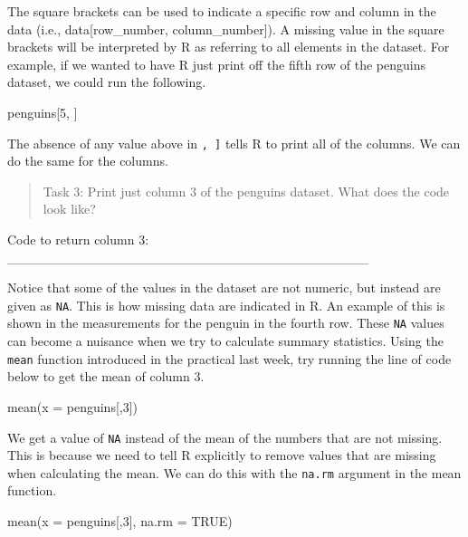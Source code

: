 \documentclass[
]{scrbook}
\newenvironment{Shaded}{\begin{snugshade}}{\end{snugshade}}
\newcommand{\AttributeTok}[1]{\textcolor[rgb]{0.77,0.63,0.00}{#1}}
\newcommand{\ConstantTok}[1]{\textcolor[rgb]{0.00,0.00,0.00}{#1}}
\newcommand{\DecValTok}[1]{\textcolor[rgb]{0.00,0.00,0.81}{#1}}
\newcommand{\FunctionTok}[1]{\textcolor[rgb]{0.00,0.00,0.00}{#1}}
\newcommand{\NormalTok}[1]{#1}
\begin{document}
The square brackets can be used to indicate a specific row and column in the data (i.e., data{[}row\_number, column\_number{]}).
A missing value in the square brackets will be interpreted by R as referring to all elements in the dataset.
For example, if we wanted to have R just print off the fifth row of the penguins dataset, we could run the following.

\begin{Shaded}
\begin{Highlighting}[]
\NormalTok{penguins[}\DecValTok{5}\NormalTok{, ]}
\end{Highlighting}
\end{Shaded}

The absence of any value above in \texttt{,\ {]}} tells R to print all of the columns. We can do the same for the columns.

\begin{quote}
Task 3: Print just column 3 of the penguins dataset. What does the code look like?
\end{quote}

Code to return column 3: \_\_\_\_\_\_\_\_\_\_\_\_\_\_\_\_\_\_\_\_\_\_\_\_\_\_\_\_\_\_\_\_\_\_\_\_\_\_

Notice that some of the values in the dataset are not numeric, but instead are given as \texttt{NA}.
This is how missing data are indicated in R.
An example of this is shown in the measurements for the penguin in the fourth row.
These \texttt{NA} values can become a nuisance when we try to calculate summary statistics.
Using the \texttt{mean} function introduced in the practical last week, try running the line of code below to get the mean of column 3.

\begin{Shaded}
\begin{Highlighting}[]
\FunctionTok{mean}\NormalTok{(}\AttributeTok{x =}\NormalTok{ penguins[,}\DecValTok{3}\NormalTok{])}
\end{Highlighting}
\end{Shaded}

We get a value of \texttt{NA} instead of the mean of the numbers that are not missing.
This is because we need to tell R explicitly to remove values that are missing when calculating the mean.
We can do this with the \texttt{na.rm} argument in the mean function.

\begin{Shaded}
\begin{Highlighting}[]
\FunctionTok{mean}\NormalTok{(}\AttributeTok{x =}\NormalTok{ penguins[,}\DecValTok{3}\NormalTok{], }\AttributeTok{na.rm =} \ConstantTok{TRUE}\NormalTok{)}
\end{Highlighting}
\end{Shaded}
\end{document}
